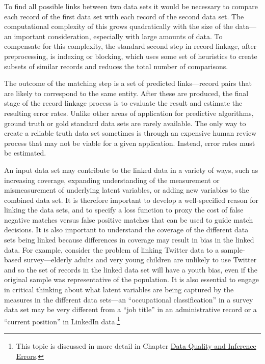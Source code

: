 \documentclass[]{krantz}
\begin{document}
To find all possible links between two data sets it would be necessary
to compare each record of the first data set with each record of the
second data set. The computational complexity of this grows
quadratically with the size of the data---an important consideration,
especially with large amounts of data. To compensate for this
complexity, the standard second step in record linkage, after
preprocessing, is indexing or blocking, which uses some set of
heuristics to create subsets of similar records and reduces the total
number of comparisons.

The outcome of the matching step is a set of predicted links---record
pairs that are likely to correspond to the same entity. After these are
produced, the final stage of the record linkage process is to evaluate
the result and estimate the resulting error rates. Unlike other areas of
application for predictive algorithms, ground truth or gold standard
data sets are rarely available. The only way to create a reliable truth
data set sometimes is through an expensive human review process that may
not be viable for a given application. Instead, error rates must be
estimated.

An input data set may contribute to the linked data in a variety of
ways, such as increasing coverage, expanding understanding of the
measurement or mismeasurement of underlying latent variables, or adding
new variables to the combined data set. It is therefore important to
develop a well-specified reason for linking the data sets, and to
specify a loss function to proxy the cost of false negative matches
versus false positive matches that can be used to guide match decisions.
It is also important to understand the coverage of the different data
sets being linked because differences in coverage may result in bias in
the linked data. For example, consider the problem of linking Twitter
data to a sample-based survey---elderly adults and very young children
are unlikely to use Twitter and so the set of records in the linked data
set will have a youth bias, even if the original sample was
representative of the population. It is also essential to engage in
critical thinking about what latent variables are being captured by the
measures in the different data sets---an ``occupational classification''
in a survey data set may be very different from a ``job title'' in an
administrative record or a ``current position'' in LinkedIn
data.\footnote{This topic is discussed in more detail in Chapter
  \protect\hyperlink{chap:errors}{Data Quality and Inference Errors}.}
\end{document}
